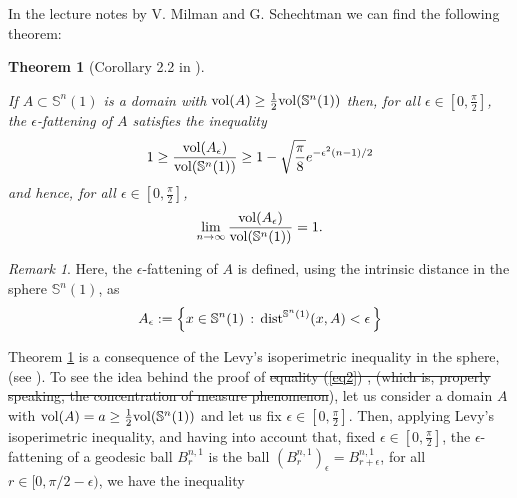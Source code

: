 \documentclass{amsart}
\newtheorem{theoremA}{Theorem}
\newtheorem{theorem}{Theorem}[section]
\theoremstyle{definition}
\theoremstyle{remark}
\newtheorem{remark}[theorem]{Remark}
\newcommand{\ese}{\mathbb{S}}
\providecommand{\DIFadd}[1]{{\protect\color{blue}\uwave{#1}}} %
\providecommand{\DIFdel}[1]{{\protect\color{red}\sout{#1}}}                      %
\providecommand{\DIFaddbegin}{} %
\providecommand{\DIFaddend}{} %
\providecommand{\DIFdelbegin}{} %
\providecommand{\DIFdelend}{} %
\begin{document}
In the lecture notes by V. Milman and G. Schechtman \cite{MS} we can find the following theorem:

\DIFdelbegin %
\DIFdelend \DIFaddbegin \begin{theoremA}[Corollary 2.2 in \cite{MS}]\DIFaddend \label{measurecon}\

 If $A\subset \mathbb{S}^n(1)$ is a domain with ${\rm vol }(A)\geq \frac{1}{2} {\rm vol}(\mathbb{S}^n(1))$ then, for all $\epsilon \in [0,\frac{\pi}{2}]$, the  $\epsilon$-fattening of $A$ satisfies the inequality
\begin{equation}\label{eq1}
1 \geq \frac{{\rm vol}(A_\epsilon)}{{\rm vol}(\mathbb{S}^n(1))}\geq 1-\sqrt{\frac{\pi}{8}}e^{-\epsilon^2(n-1)/2}
\end{equation}
\noindent and hence, for all $\epsilon \in [0,\frac{\pi}{2}]$, 
\begin{equation}\label{eq2}
\lim_{n\to \infty} \frac{{\rm vol}(A_\epsilon)}{{\rm vol}(\mathbb{S}^n(1))}= 1.
\end{equation}
\DIFdelbegin %
\DIFdelend \DIFaddbegin \end{theoremA}  
\DIFaddend \begin{remark}
Here, the $\epsilon$-fattening of $A$ is defined, using the intrinsic distance in the sphere $\ese^n(1)$, as
$$A_\epsilon:=\left\{x\in \mathbb{S}^n(1)\, :\, {\rm dist}^{\mathbb{S}^n(1)}(x,A)<\epsilon\, \right\}
$$
 \end{remark}

 Theorem \ref{measurecon} is a consequence of the Levy's isoperimetric inequality in the sphere, (see \cite{MS}).
  To see the idea behind the proof of \DIFdelbegin \DIFdel{equality (\ref{eq2}) , (which is, properly speaking, the concentration of measure phenomenon}\DIFdelend \DIFaddbegin \DIFadd{assertions (\ref{eq1}) and (\ref{eq2}}\DIFaddend ), let us consider a  domain $A$ with ${\rm vol }(A)=a \geq \frac{1}{2} {\rm vol}(\mathbb{S}^n(1))$ and let us fix $\epsilon \in [0,\frac{\pi}{2}]$. Then,  applying Levy's isoperimetric inequality, and having into account that, fixed $\epsilon \in [0,\frac{\pi}{2}]$, the $\epsilon$-fattening of a geodesic ball $B^{n,1}_{r}$ is the ball $(B^{n,1}_{r})_{\epsilon}=B^{n,1}_{r+\epsilon}$, for all $r \in [0,\pi/2-\epsilon)$, we have the inequality
\end{document}
